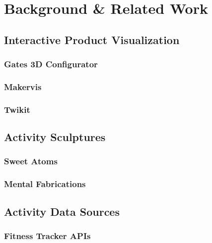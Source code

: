 \label{ch:related}
\section{Background \& Related Work}
\subsection{Interactive Product Visualization}
\subsubsection{Gates 3D Configurator}
\subsubsection{Makervis}
\subsubsection{Twikit}
\subsection{Activity Sculptures}
\subsubsection{Sweet Atoms}
\subsubsection{Mental Fabrications}
\subsection{Activity Data Sources}
\subsubsection{Fitness Tracker APIs}
